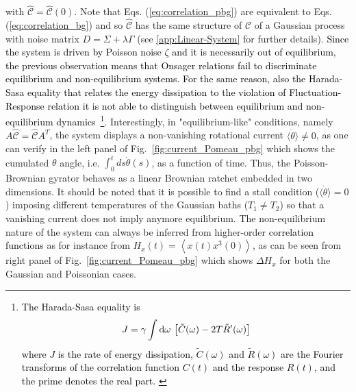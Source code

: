 \documentclass[12pt]{iopart}
\newcommand{\lx} {\left}
\newcommand{\rx} {\right}
\newcommand{\ave}[1] {\lx\langle #1 \rx\rangle}
\newcommand{\cC} {\mathcal{C}}
\begin{document}
with $\hat{\cC}=\hat{\cC}(0)$. Note that Eqs. (\ref{eq:correlation_pbg}) are equivalent to Eqs. (\ref{eq:correlation_bg}) and so $\hat{\cC}$ has the same structure of $\cC$ of a Gaussian process with noise matrix $D=\Sigma+\lambda\Gamma$ (see \textcolor{black}{\ref{app:Linear-System}} for further details). \textcolor{black}{Since the system is driven by Poisson noise $\zeta$ and it is necessarily out of equilibrium, the previous observation means that Onsager relations \cite{onsager1931} fail to discriminate equilibrium and non-equilibrium systems. For the same reason, also the Harada-Sasa equality that relates the energy dissipation to the violation of Fluctuation-Response relation \cite{harada2005equality} it is not able to distinguish between equilibrium and non-equilibrium dynamics}~\footnote{\textcolor{black}{The Harada-Sasa equality is \cite{harada2005equality} $$J=\gamma\int{{\rm d}\omega\,\lx[\tilde{C}(\omega)-2T \tilde{R}'(\omega)\rx]}$$ where $J$ is the rate of energy dissipation, $\tilde{C}(\omega)$ and $\tilde{R}(\omega)$ are the Fourier transforms of the correlation function $C(t)$ and the response $R(t)$, and the prime denotes the real part. }}. Interestingly, in "equilibrium-like" conditions, namely $A\hat{\cC}=\hat{\cC} A^T$, the system displays a non-vanishing rotational current $\langle \dot{\theta}\rangle\neq 0$, as one can verify in the left panel of Fig.~\ref{fig:current_Pomeau_pbg} which shows the cumulated $\theta$ angle, i.e. $\int_0^t ds \dot\theta(s)$, as a function of time. Thus, the Poisson-Brownian gyrator behaves as a linear Brownian ratchet embedded in two dimensions. It should be noted that it is possible to find a stall condition ($\langle \dot{\theta} \rangle=0$) imposing different temperatures of the Gaussian baths ($T_1\neq T_2$) so that a vanishing current does not imply anymore equilibrium. The non-equilibrium nature of the system can always be inferred from higher-order \textcolor{black}{correlation functions} as for instance from $H_x(t)=\ave{x(t)x^3(0)}$, as can be seen from right panel of Fig.~\ref{fig:current_Pomeau_pbg} which shows $\Delta H_x$ for both the Gaussian and Poissonian cases.  
\end{document}
